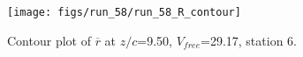 \begin{figure}[H]
\centering
\texttt{[image: figs/run\_58/run\_58\_R\_contour]}
\caption{Contour plot of $\overline{r}$ at $z/c$=9.50, $V_{free}$=29.17, station 6.}
\end{figure}



